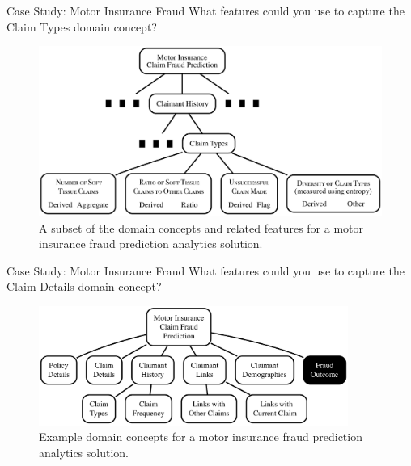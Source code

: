 \documentclass[xcolor={table}]{beamer}
\begin{document}
 \begin{frame} [plain]
 \begin{block}{Case Study: Motor Insurance Fraud}
What features could you use to capture the Claim Types domain concept?
\begin{figure}[htb]
	\begin{center}
			\includegraphics[width=\textwidth]{./images/motorInsurance3_SMCAPS.pdf}
	\end{center}
	\caption{A subset of the domain concepts and related features for a motor insurance fraud prediction analytics solution.}
	\label{fig:metricExample2}
\end{figure}
\end{block}
\end{frame} 


 \begin{frame} [plain]
 \begin{block}{Case Study: Motor Insurance Fraud}
What features could you use to capture the Claim Details domain concept?
\begin{figure}[htb]
	\begin{center}
			\includegraphics[width=0.9\textwidth]{./images/motorInsurance1.pdf}
	\end{center}
	\caption{Example domain concepts for a motor insurance fraud prediction analytics solution.}
	\label{fig:DataMetrics3}
\end{figure}
\end{block}
\end{frame} 
\end{document}
